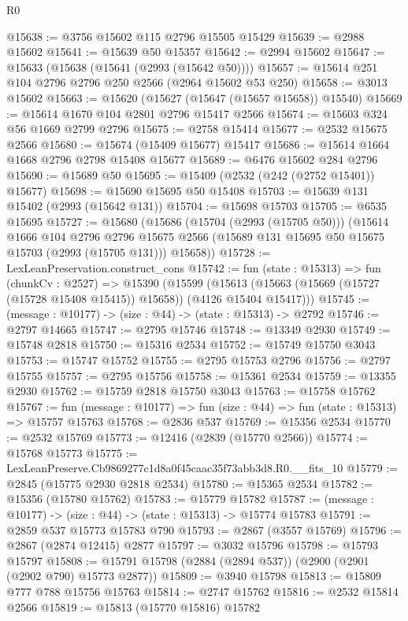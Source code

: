 \begin{lexlean}{R0}
\begin{coremodule}
@15638 := @3756 @15602 @115 @2796 @15505 @15429
@15639 := @2988 @15602
@15641 := @15639 @50 @15357
@15642 := @2994 @15602
@15647 := @15633 (@15638 (@15641 (@2993 (@15642 @50))))
@15657 := @15614 @251 @104 @2796 @2796 @250 @2566 (@2964 @15602 @53 @250)
@15658 := @3013 @15602
@15663 := @15620 (@15627 (@15647 (@15657 @15658)) @15540)
@15669 := @15614 @1670 @104 @2801 @2796 @15417 @2566
@15674 := @15603 @324 @56 @1669 @2799 @2796
@15675 := @2758 @15414
@15677 := @2532 @15675 @2566
@15680 := @15674 (@15409 @15677) @15417
@15686 := @15614 @1664 @1668 @2796 @2798 @15408 @15677
@15689 := @6476 @15602 @284 @2796
@15690 := @15689 @50
@15695 := @15409 (@2532 (@242 (@2752 @15401)) @15677)
@15698 := @15690 @15695 @50 @15408
@15703 := @15639 @131 @15402 (@2993 (@15642 @131))
@15704 := @15698 @15703
@15705 := @6535 @15695
@15727 := @15680
    (@15686
      (@15704 (@2993 (@15705 @50)))
      (@15614
        @1666
        @104
        @2796
        @2796
        @15675
        @2566
        (@15689 @131 @15695 @50 @15675 @15703 (@2993 (@15705 @131)))
        @15658))
@15728 := LexLeanPreservation.construct_cons
@15742 := fun (state : @15313) =>
  fun (chunkCv : @2527) =>
  @15390
    (@15599 (@15613 (@15663 (@15669 (@15727 (@15728 @15408 @15415)) @15658)) (@4126 @15404 @15417)))
@15745 := (message : @10177) -> (size : @44) -> (state : @15313) -> @2792
@15746 := @2797 @14665
@15747 := @2795 @15746
@15748 := @13349 @2930
@15749 := @15748 @2818
@15750 := @15316 @2534
@15752 := @15749 @15750 @3043
@15753 := @15747 @15752
@15755 := @2795 @15753 @2796
@15756 := @2797 @15755
@15757 := @2795 @15756
@15758 := @15361 @2534
@15759 := @13355 @2930
@15762 := @15759 @2818 @15750 @3043
@15763 := @15758 @15762
@15767 := fun (message : @10177) => fun (size : @44) => fun (state : @15313) => @15757 @15763
@15768 := @2836 @537
@15769 := @15356 @2534
@15770 := @2532 @15769
@15773 := @12416 (@2839 (@15770 @2566))
@15774 := @15768 @15773
@15775 := LexLeanPreserve.Cb9869277c1d8a0f45caac35f73abb3d8.R0.__fits_10
@15779 := @2845 (@15775 @2930 @2818 @2534)
@15780 := @15365 @2534
@15782 := @15356 (@15780 @15762)
@15783 := @15779 @15782
@15787 := (message : @10177) -> (size : @44) -> (state : @15313) -> @15774 @15783
@15791 := @2859 @537 @15773 @15783 @790
@15793 := @2867 (@3557 @15769)
@15796 := @2867 (@2874 @12415) @2877
@15797 := @3032 @15796
@15798 := @15793 @15797
@15808 := @15791 @15798 (@2884 (@2894 @537)) (@2900 (@2901 (@2902 @790) @15773 @2877))
@15809 := @3940 @15798
@15813 := @15809 @777 @788 @15756 @15763
@15814 := @2747 @15762
@15816 := @2532 @15814 @2566
@15819 := @15813 (@15770 @15816) @15782

\end{coremodule}
\end{lexlean}
